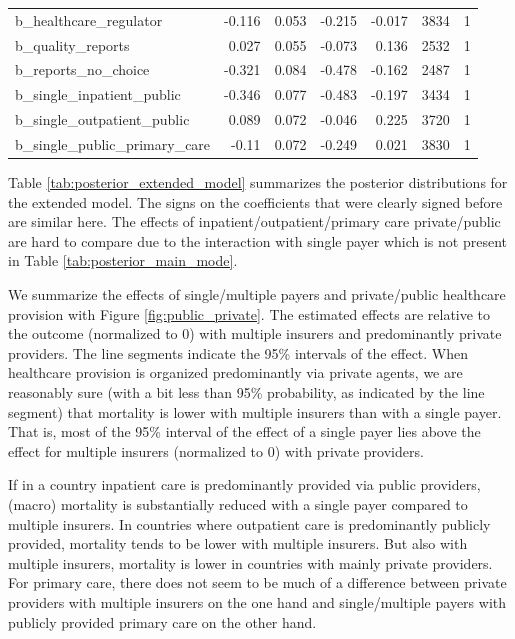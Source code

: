 \documentclass[a4paper,12pt]{article}
\begin{document}
\begin{table}[htbp]
\begin{tabular}{lrrrrrr}
b\_healthcare\_regulator & -0.116 & 0.053 & -0.215 & -0.017 & 3834 & 1\\
b\_quality\_reports & 0.027 & 0.055 & -0.073 & 0.136 & 2532 & 1\\
b\_reports\_no\_choice & -0.321 & 0.084 & -0.478 & -0.162 & 2487 & 1\\
b\_single\_inpatient\_public & -0.346 & 0.077 & -0.483 & -0.197 & 3434 & 1\\
b\_single\_outpatient\_public & 0.089 & 0.072 & -0.046 & 0.225 & 3720 & 1\\
b\_single\_public\_primary\_care & -0.11 & 0.072 & -0.249 & 0.021 & 3830 & 1\\
\end{tabular}
\end{table}


Table \ref{tab:posterior_extended_model} summarizes the posterior distributions for the extended model. The signs on the coefficients that were clearly signed before are similar here. The effects of inpatient/outpatient/primary care private/public are hard to compare due to the interaction with single payer which is not present in Table \ref{tab:posterior_main_mode}.

We summarize the effects of single/multiple payers and private/public healthcare provision with Figure \ref{fig:public_private}. The estimated effects are relative to the outcome (normalized to 0) with multiple insurers and predominantly private providers. The line segments indicate the 95\% intervals of the effect. When healthcare provision is organized predominantly via private agents, we are reasonably sure (with a bit less than 95\% probability, as indicated by the line segment) that mortality is lower with multiple insurers than with a single payer. That is, most of the 95\% interval of the effect of a single payer lies above the effect for multiple insurers (normalized to 0) with private providers.

If in a country inpatient care is predominantly provided via public providers, (macro) mortality is substantially reduced with a single payer compared to multiple insurers. In countries where outpatient care is predominantly publicly provided, mortality tends to be lower with multiple insurers. But also with multiple insurers, mortality is lower in countries with mainly private providers. For primary care, there does not seem to be much of a difference between private providers with multiple insurers on the one hand and single/multiple payers with publicly provided primary care on the other hand.
\end{document}

